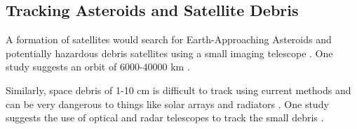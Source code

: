 \subsection{Tracking Asteroids and Satellite Debris }

A formation of satellites would search for Earth-Approaching Asteroids
and potentially hazardous debris satellites using a small imaging
telescope \cite{Ref:Carroll}. One study suggests an orbit of 6000-40000
km \cite{Ref:Leitch}. 

Similarly, space debris of 1-10 cm is difficult to track using current
methods and can be very dangerous to things like solar arrays and
radiators \cite{Ref:Guerrero}. One study suggests the use of optical
and radar telescopes to track the small debris \cite{Ref:Tolkachev}.

